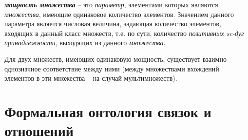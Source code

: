 \textbf{\textit{мощность множества}} – это \textit{параметр}, элементами которых являются \textit{множества}, имеющие одинаковое количество элементов. Значением данного параметра является числовая величина, задающая количество элементов, входящих в данный класс множеств, т.е. по сути, количество \textit{позитивных sc-дуг принадлежности}, выходящих из данного \textit{множества}.
	
	Для двух множеств, имеющих одинаковую мощность, существует взаимно-однозначное соответствие между ними (между множествами вхождений элементов в эти множества – на случай мультимножеств).

\section{Формальная онтология связок и отношений}
\label{sec_top_ontologies_rel}

\begin{SCn}
\end{SCn}

